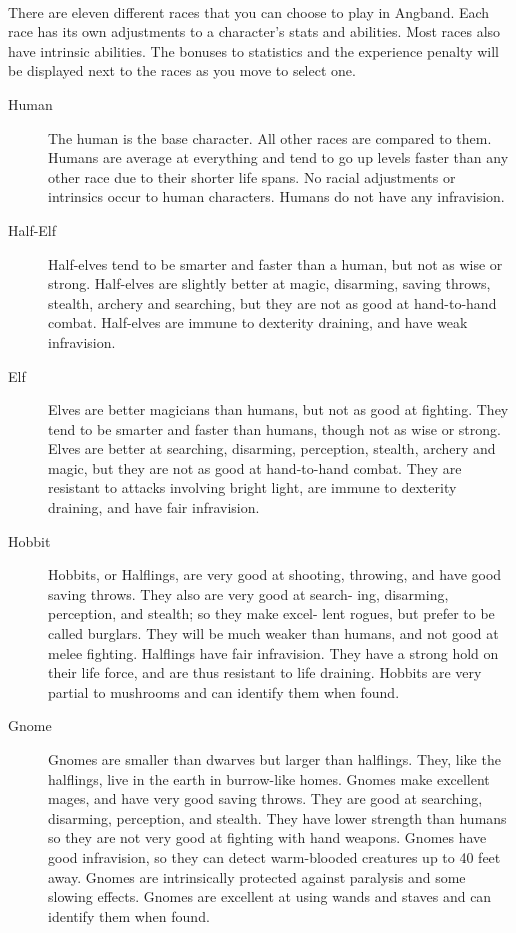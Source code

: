 \paragraph{}
There are eleven different races that you can choose to play in Angband.
Each race has its own adjustments to a character's stats and abilities.
Most races also have intrinsic abilities. The bonuses to statistics and
the experience penalty will be displayed next to the races as you move
to select one.
\begin{description}
\item[Human] The human is the base character. All other races are compared
     to them. Humans are average at everything and tend to go
     up levels faster than any other race due to their shorter life
     spans. No racial adjustments or intrinsics occur to human
     characters. Humans do not have any infravision.

\item[Half-Elf] Half-elves tend to be smarter and faster than a human, but
     not as wise or strong. Half-elves are slightly better at magic,
     disarming, saving throws, stealth, archery and searching, but
     they are not as good at hand-to-hand combat. Half-elves are
     immune to dexterity draining, and have weak infravision.

\item[Elf] Elves are better magicians than humans, but not as good at
     fighting. They tend to be smarter and faster than humans,
     though not as wise or strong. Elves are better at searching,
     disarming, perception, stealth, archery and magic, but they are
     not as good at hand-to-hand combat. They are resistant to
     attacks involving bright light, are immune to dexterity
     draining, and have fair infravision.

\item[Hobbit] Hobbits, or Halflings, are very good at shooting, throwing, and
     have good saving throws. They also are very good at search-
     ing, disarming, perception, and stealth; so they make excel-
     lent rogues, but prefer to be called burglars. They will be
     much weaker than humans, and not good at melee fighting.
     Halflings have fair infravision. They have a strong hold
     on their life force, and are thus resistant to life
     draining. Hobbits are very partial to mushrooms and can
     identify them when found.

\item[Gnome] Gnomes are smaller than dwarves but larger than halflings.
     They, like the halflings, live in the earth in burrow-like
     homes. Gnomes make excellent mages, and have very good saving
     throws. They are good at searching, disarming, perception,
     and stealth. They have lower strength than humans so they
     are not very good at fighting with hand weapons. Gnomes have
     good infravision, so they can detect warm-blooded creatures
     up to 40 feet away. Gnomes are intrinsically protected against
     paralysis and some slowing effects. Gnomes are excellent at
     using wands and staves and can identify them when found.


\end{description}
